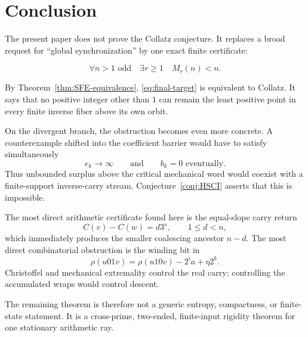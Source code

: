 \documentclass[11pt,reqno]{amsart}
\numberwithin{equation}{section}
\theoremstyle{definition}
\theoremstyle{remark}
\begin{document}
\section{Conclusion}

The present paper does not prove the Collatz conjecture.  It replaces a broad
request for ``global synchronization'' by one exact finite certificate:

\begin{equation}\label{eq:final-target}
\boxed{
\forall n>1\text{ odd}\quad
\exists r\ge1\quad
M_r(n)<n.
}
\end{equation}

By Theorem~\ref{thm:SFE-equivalence}, \eqref{eq:final-target} is equivalent
to Collatz.  It says that no positive integer other than $1$ can remain the
least positive point in every finite inverse fiber above its own orbit.

On the divergent branch, the obstruction becomes even more concrete.  A
counterexample shifted into the coefficient barrier would have to satisfy
simultaneously
\[
e_k\to\infty
\qquad\text{and}\qquad
b_k=0\text{ eventually}.
\]
Thus unbounded surplus above the critical mechanical word would coexist with
a finite-support inverse-carry stream.  Conjecture~\ref{conj:HSCI} asserts
that this is impossible.

The most direct arithmetic certificate found here is the equal-slope carry
return
\[
C(v)-C(w)=d3^s,
\qquad
1\le d<n,
\]
which immediately produces the smaller coalescing ancestor $n-d$.  The most
direct combinatorial obstruction is the winding bit in
\[
\rho(u01v)
=
\rho(u10v)-2^ia+\eta2^k.
\]
Christoffel and mechanical extremality control the real carry; controlling
the accumulated wraps would control descent.

The remaining theorem is therefore not a generic entropy, compactness, or
finite-state statement.  It is a cross-prime, two-ended, finite-input
rigidity theorem for one stationary arithmetic ray.
\end{document}
